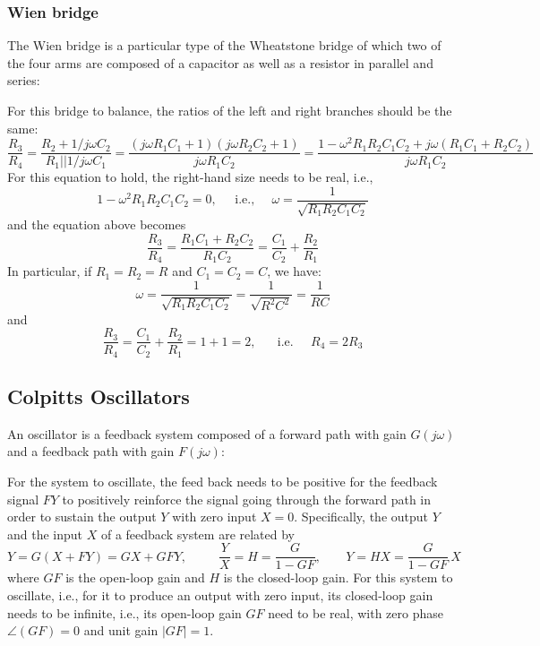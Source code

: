 
\subsubsection*{Wien bridge}

The Wien bridge is a particular type of the Wheatstone bridge of which
two of the four arms are composed of a capacitor as well as a resistor
in parallel and series:


For this bridge to balance, the ratios of the left and right branches
should be the same:
\[
\frac{R_3}{R_4}=\frac{R_2+1/j\omega C_2}{R_1||1/j\omega C_1}
=\frac{(j\omega R_1C_1+1)(j\omega R_2C_2+1)}{j\omega R_1C_2}
=\frac{1-\omega^2R_1R_2C_1C_2+j\omega(R_1C_1+R_2C_2)}{j\omega R_1C_2}
\]
For this equation to hold, the right-hand size needs to be real, i.e.,
\[
1-\omega^2R_1R_2C_1C_2=0,\;\;\;\;\;\mbox{i.e.,}\;\;\;\;\;
\omega=\frac{1}{\sqrt{R_1R_2C_1C_2}}
\]
and the equation above becomes
\[
\frac{R_3}{R_4}=\frac{R_1C_1+R_2C_2}{R_1C_2}=\frac{C_1}{C_2}+\frac{R_2}{R_1}
\]
In particular, if $R_1=R_2=R$ and $C_1=C_2=C$, we have:
\[
\omega=\frac{1}{\sqrt{R_1R_2C_1C_2}}
=\frac{1}{\sqrt{R^2C^2}}=\frac{1}{RC}
\]
and
\[
\frac{R_3}{R_4}=\frac{C_1}{C_2}+\frac{R_2}{R_1}=1+1=2,
\;\;\;\;\;\;\mbox{i.e.}\;\;\;\;\;R_4=2R_3
\]

\subsection{Colpitts Oscillators}

An oscillator is a feedback system composed of a forward path with
gain $G(j\omega)$ and a feedback path with gain $F(j\omega)$:


For the system to oscillate, the feed back needs to be positive for
the feedback signal $FY$ to positively reinforce the signal going 
through the forward path in order to sustain the output $Y$ with
zero input $X=0$. Specifically, the output $Y$ and the input $X$ 
of a feedback system are related by
\[
Y=G(X+FY)=GX+GFY,\;\;\;\;\;\;\;\;\;\frac{Y}{X}=H=\frac{G}{1-GF},
\;\;\;\;\;\;\;Y=HX=\frac{G}{1-GF}\,X
\]
where $GF$ is the open-loop gain and $H$ is the closed-loop gain.
For this system to oscillate, i.e., for it to produce an output with
zero input, its closed-loop gain needs to be infinite, i.e., its 
open-loop gain $GF$ need to be real, with zero phase $\angle(GF)=0$
and unit gain $|GF|=1$. 

